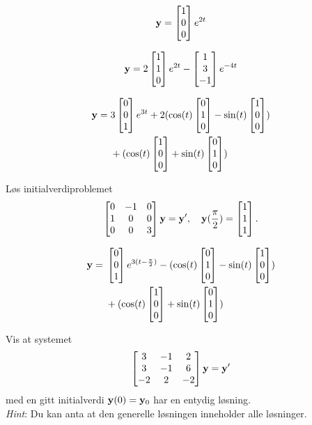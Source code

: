 \begin{losning}


\begin{punkt}
	$$\mathbf{y}=\begin{bmatrix} 1 \\ 0 \\ 0 \end{bmatrix}e^{2t}$$
\end{punkt}

\begin{punkt}
	$$\mathbf{y}=2\begin{bmatrix} 1 \\ 1 \\ 0 \end{bmatrix}e^{2t}-\begin{bmatrix} 1 \\ 3 \\ -1 \end{bmatrix}e^{-4t}$$
\end{punkt}

\begin{punkt}
	$$	\begin{aligned}
	\mathbf{y}= {} & 3\begin{bmatrix} 0 \\ 0 \\ 1 \end{bmatrix}e^{3t}+2(\cos (t) \begin{bmatrix} 0 \\ 1 \\ 0 \end{bmatrix}-\sin (t) \begin{bmatrix} 1 \\ 0 \\ 0 \end{bmatrix})\\
	& +(\cos (t) \begin{bmatrix} 1 \\ 0 \\ 0 \end{bmatrix}+\sin (t) \begin{bmatrix} 0 \\ 1 \\ 0 \end{bmatrix})
	\end{aligned}$$
	
\end{punkt}


	

\end{losning}

\begin{oppgave}
Løs initialverdiproblemet $$
\begin{bmatrix}
0 & -1 & 0\\
1 & 0 & 0\\
0 & 0 & 3
\end{bmatrix}
\mathbf{y}=\mathbf{y}',\quad \mathbf{y}(\frac{\pi}{2})=\begin{bmatrix} 1 \\ 1 \\ 1 \end{bmatrix}.
$$
\end{oppgave}

\begin{losning}
	$$	\begin{aligned}
	\mathbf{y}= {} & \begin{bmatrix} 0 \\ 0 \\ 1 \end{bmatrix}e^{3(t-\frac{\pi}{2})}-(\cos (t) \begin{bmatrix} 0 \\ 1 \\ 0 \end{bmatrix}-\sin (t) \begin{bmatrix} 1 \\ 0 \\ 0 \end{bmatrix})\\
	& +(\cos (t) \begin{bmatrix} 1 \\ 0 \\ 0 \end{bmatrix}+\sin (t) \begin{bmatrix} 0 \\ 1 \\ 0 \end{bmatrix})
	\end{aligned}$$
\end{losning}


\begin{oppgave}
Vis at systemet
$$
\begin{bmatrix}
3 & -1 & 2\\
3 & -1 & 6\\
-2 & 2 & -2
\end{bmatrix} \mathbf{y}= \mathbf{y} '$$
med en gitt initialverdi $\mathbf{y}(0)=\mathbf{y}_0$ har en entydig løsning.\\

\noindent
\emph{Hint}: Du kan anta at den generelle løsningen inneholder alle løsninger.
\end{oppgave}

